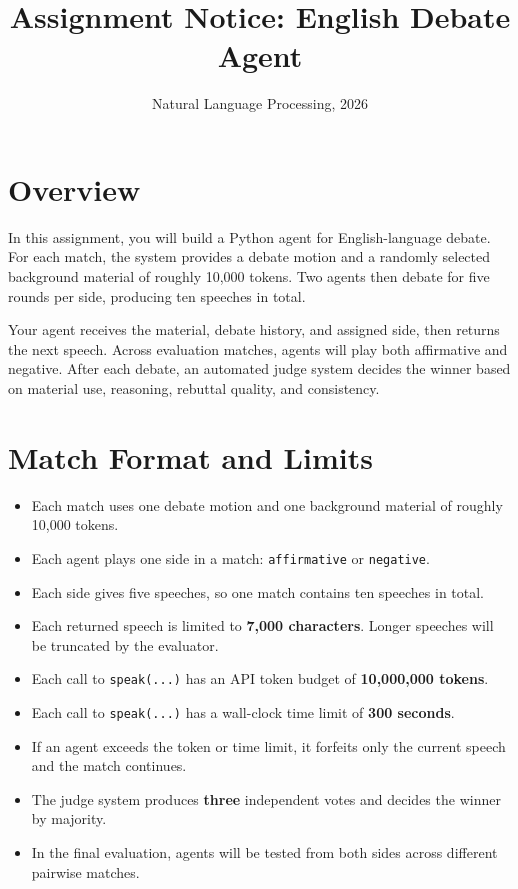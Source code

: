 \documentclass[11pt]{article}
\title{\textbf{Assignment Notice: English Debate Agent}}
\author{Natural Language Processing, 2026}
\date{}
\begin{document}
\maketitle

\section*{Overview}

In this assignment, you will build a Python agent for English-language debate. For each match, the system provides a debate motion and a randomly selected background material of roughly 10,000 tokens. Two agents then debate for five rounds per side, producing ten speeches in total.

Your agent receives the material, debate history, and assigned side, then returns the next speech. Across evaluation matches, agents will play both affirmative and negative. After each debate, an automated judge system decides the winner based on material use, reasoning, rebuttal quality, and consistency.

\section*{Match Format and Limits}

\begin{itemize}
    \item Each match uses one debate motion and one background material of roughly 10,000 tokens.
    \item Each agent plays one side in a match: \texttt{affirmative} or \texttt{negative}.
    \item Each side gives five speeches, so one match contains ten speeches in total.
    \item Each returned speech is limited to \textbf{7,000 characters}. Longer speeches will be truncated by the evaluator.
    \item Each call to \texttt{speak(...)} has an API token budget of \textbf{10,000,000 tokens}.
    \item Each call to \texttt{speak(...)} has a wall-clock time limit of \textbf{300 seconds}.
    \item If an agent exceeds the token or time limit, it forfeits only the current speech and the match continues.
    \item The judge system produces \textbf{three} independent votes and decides the winner by majority.
    \item In the final evaluation, agents will be tested from both sides across different pairwise matches.
\end{itemize}
\end{document}
